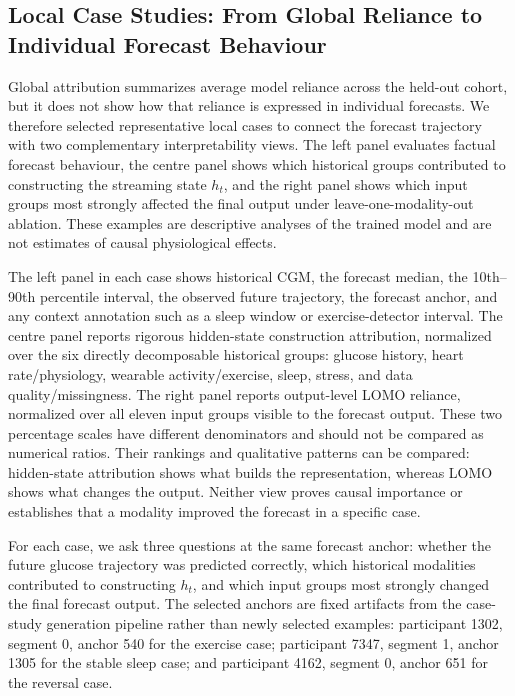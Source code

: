 \subsection{Local Case Studies: From Global Reliance to Individual Forecast Behaviour}
\label{subsec:interp_local_cases}

Global attribution summarizes average model reliance across the held-out
cohort, but it does not show how that reliance is expressed in individual
forecasts. We therefore selected representative local cases to connect the
forecast trajectory with two complementary interpretability views. The left
panel evaluates factual forecast behaviour, the centre panel shows which
historical groups contributed to constructing the streaming state $h_t$, and
the right panel shows which input groups most strongly affected the final
output under leave-one-modality-out ablation. These examples are descriptive
analyses of the trained model and are not estimates of causal physiological
effects.

The left panel in each case shows historical CGM, the forecast median, the
10th--90th percentile interval, the observed future trajectory, the forecast
anchor, and any context annotation such as a sleep window or exercise-detector
interval. The centre panel reports rigorous hidden-state construction
attribution, normalized over the six directly decomposable historical groups:
glucose history, heart rate/physiology, wearable activity/exercise, sleep,
stress, and data quality/missingness. The right panel reports output-level
LOMO reliance, normalized over all eleven input groups visible to the forecast
output. These two percentage scales have different denominators and should not
be compared as numerical ratios. Their rankings and qualitative patterns can
be compared: hidden-state attribution shows what builds the representation,
whereas LOMO shows what changes the output. Neither view proves causal
importance or establishes that a modality improved the forecast in a specific
case.

For each case, we ask three questions at the same forecast anchor: whether the
future glucose trajectory was predicted correctly, which historical modalities
contributed to constructing $h_t$, and which input groups most strongly changed
the final forecast output. The selected anchors are fixed artifacts from the
case-study generation pipeline rather than newly selected examples:
participant 1302, segment 0, anchor 540 for the exercise case; participant
7347, segment 1, anchor 1305 for the stable sleep case; and participant 4162,
segment 0, anchor 651 for the reversal case.

